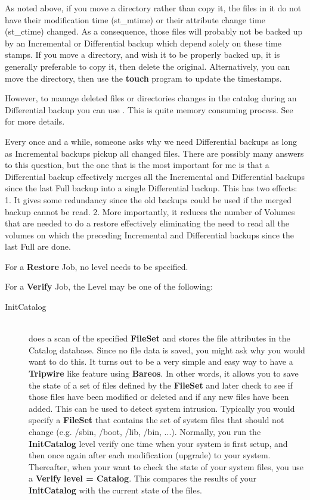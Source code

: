 \begin{description}
\begin{description}
As noted above, if you move a directory rather than copy it, the
files in it do not have their modification time (st\_mtime) or
their attribute change time (st\_ctime) changed.  As a
consequence, those files will probably not be backed up by an
Incremental or Differential backup which depend solely on these
time stamps.  If you move a directory, and wish it to be
properly backed up, it is generally preferable to copy it, then
delete the original. Alternatively, you can move the directory, then
use the {\bf touch} program to update the timestamps.

However, to manage deleted files or directories changes in the
catalog during an Differential backup you can use .
This is quite memory consuming process. See  for more details.

Every once and a while, someone asks why we need Differential
backups as long as Incremental backups pickup all changed files.
There are possibly many answers to this question, but the one
that is the most important for me is that a Differential backup
effectively merges
all the Incremental and Differential backups since the last Full backup
into a single Differential backup.  This has two effects: 1.  It gives
some redundancy since the old backups could be used if the merged backup
cannot be read.  2.  More importantly, it reduces the number of Volumes
that are needed to do a restore effectively eliminating the need to read
all the volumes on which the preceding Incremental and Differential
backups since the last Full are done.

\end{description}

For a {\bf Restore} Job, no level needs to be specified.

For a {\bf Verify} Job, the Level may be one of the  following:

\begin{description}

\item [InitCatalog] \hfill \\
does a scan of the specified {\bf FileSet} and stores the file
attributes in the Catalog database.  Since no file data is saved, you
might ask why you would want to do this.  It turns out to be a very
simple and easy way to have a {\bf Tripwire} like feature using {\bf
Bareos}.  In other words, it allows you to save the state of a set of
files defined by the {\bf FileSet} and later check to see if those files
have been modified or deleted and if any new files have been added.
This can be used to detect system intrusion.  Typically you would
specify a {\bf FileSet} that contains the set of system files that
should not change (e.g.  /sbin, /boot, /lib, /bin, ...).  Normally, you
run the {\bf InitCatalog} level verify one time when your system is
first setup, and then once again after each modification (upgrade) to
your system.  Thereafter, when your want to check the state of your
system files, you use a {\bf Verify} {\bf level = Catalog}.  This
compares the results of your {\bf InitCatalog} with the current state of
the files.


\end{description}
\end{description}
